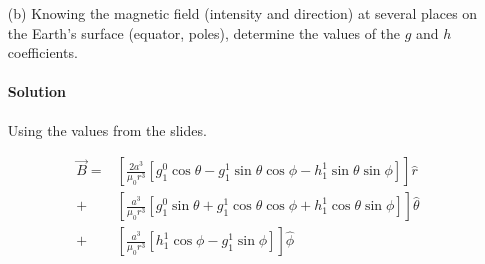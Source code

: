 \documentclass{article}
\begin{document}
{\begin{enumerate}
		\begin{equation*}
			\begin{split}
				\hat{\phi} &: \frac{1}{r \sin \theta} \frac{\partial}{\partial \phi} \frac{a^3}{\mu_0 r^2} \left[ g^0_1 \cos \theta -  g^1_1 \sin \theta \cos \phi - h^1_1 \sin \theta \sin \phi \right] \\
				&= \frac{a^3}{\mu_0 r^3} \frac{1}{\sin \theta} \frac{\partial}{\partial \phi} \left[ g^0_1 \cos \theta -  g^1_1 \sin \theta \cos \phi - h^1_1 \sin \theta \sin \phi \right] \\
				&= \frac{a^3}{\mu_0 r^3} \frac{1}{\sin \theta} \left[ 0 + g^1_1 \sin \theta \sin \phi - h^1_1 \sin \theta \cos \phi \right] \\
				&= \frac{a^3}{\mu_0 r^3} \left[ g^1_1 \sin \phi - h^1_1 \cos \phi \right]
			\end{split}
		\end{equation*}
		It is typical when dealing with spherical coordinates to find that components depend on each other, as apparent from $\vec{\nabla}$. Now the final equation for $\vec{B}$:
		\begin{equation*}
			\begin{split}
				\vec{B}(r,\theta,\phi) = &\left[ \frac{2a^3}{\mu_0 r^3} \left[ g^0_1 \cos \theta - g^1_1 \sin \theta \cos \phi - h^1_1 \sin \theta \sin \phi \right] \right] \hat{r} \\
				+ &\left[ \frac{a^3}{\mu_0 r^3} \left[ g^0_1 \sin \theta + g^1_1 \cos \theta \cos \phi + h^1_1 \cos \theta \sin \phi \right] \right] \hat{\theta} \\
				+ &\left[ \frac{a^3}{\mu_0 r^3} \left[ h^1_1 \cos \phi - g^1_1 \sin \phi \right] \right] \hat{\phi}
			\end{split}
		\end{equation*}
		
		\clearpage
		
		\boldmath
		\item[(b)] Knowing the magnetic field (intensity and direction) at several places on the Earth’s surface (equator, poles), determine the values of the $g$ and $h$ coefficients.
		\paragraph{Solution} Using the values from the slides. \unboldmath
		
		\begin{equation*}
			\begin{split}
				\vec{B} = &\left[ \frac{2a^3}{\mu_0 r^3} \left[ g^0_1 \cos \theta - g^1_1 \sin \theta \cos \phi - h^1_1 \sin \theta \sin \phi \right] \right] \hat{r} \\
				+ &\left[ \frac{a^3}{\mu_0 r^3} \left[ g^0_1 \sin \theta + g^1_1 \cos \theta \cos \phi + h^1_1 \cos \theta \sin \phi \right] \right] \hat{\theta} \\
				+ &\left[ \frac{a^3}{\mu_0 r^3} \left[ h^1_1 \cos \phi - g^1_1 \sin \phi \right] \right] \hat{\phi}
			\end{split}
		\end{equation*}
		

\end{enumerate}}
\end{document}
